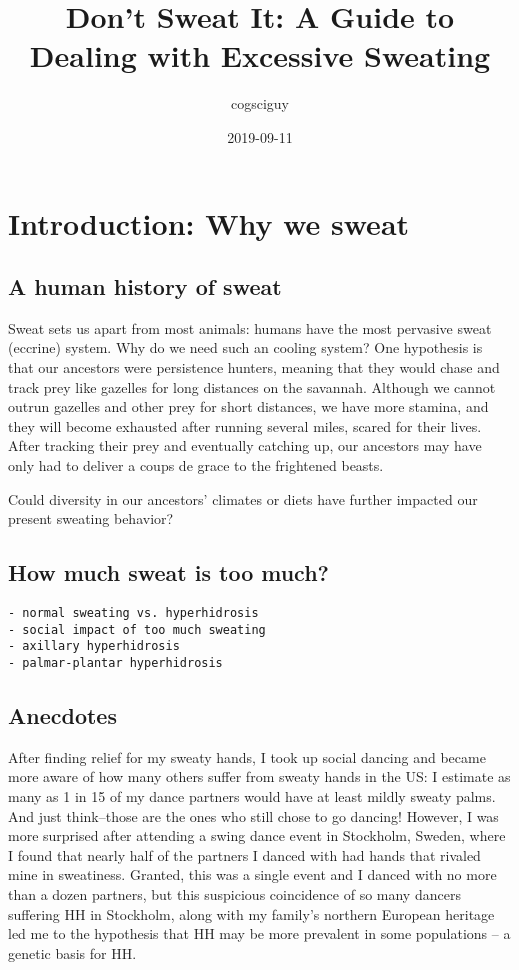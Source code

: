 \documentclass[]{book}
\title{Don't Sweat It: A Guide to Dealing with Excessive Sweating}
\author{cogsciguy}
\date{2019-09-11}
\begin{document}
\maketitle

{
\setcounter{tocdepth}{1}
\tableofcontents
}
\hypertarget{intro}{%
\chapter{Introduction: Why we sweat}\label{intro}}

\hypertarget{a-human-history-of-sweat}{%
\section{A human history of sweat}\label{a-human-history-of-sweat}}

Sweat sets us apart from most animals: humans have the most pervasive sweat (eccrine) system.
Why do we need such an cooling system?
One hypothesis is that our ancestors were persistence hunters, meaning that they would chase and track prey like gazelles for long distances on the savannah.
Although we cannot outrun gazelles and other prey for short distances, we have more stamina, and they will become exhausted after running several miles, scared for their lives.
After tracking their prey and eventually catching up, our ancestors may have only had to deliver a coups de grace to the frightened beasts.

Could diversity in our ancestors' climates or diets have further impacted our present sweating behavior?

\hypertarget{how-much-sweat-is-too-much}{%
\section{How much sweat is too much?}\label{how-much-sweat-is-too-much}}

\begin{verbatim}
- normal sweating vs. hyperhidrosis
- social impact of too much sweating
- axillary hyperhidrosis
- palmar-plantar hyperhidrosis
\end{verbatim}

\hypertarget{anecdotes}{%
\section{Anecdotes}\label{anecdotes}}

After finding relief for my sweaty hands, I took up social dancing and became more aware of how many others suffer from sweaty hands in the US: I estimate as many as 1 in 15 of my dance partners would have at least mildly sweaty palms.
And just think--those are the ones who still chose to go dancing!
However, I was more surprised after attending a swing dance event in Stockholm, Sweden, where I found that nearly half of the partners I danced with had hands that rivaled mine in sweatiness.
Granted, this was a single event and I danced with no more than a dozen partners, but this suspicious coincidence of so many dancers suffering HH in Stockholm, along with my family's northern European heritage led me to the hypothesis that HH may be more prevalent in some populations -- a genetic basis for HH.
\end{document}
